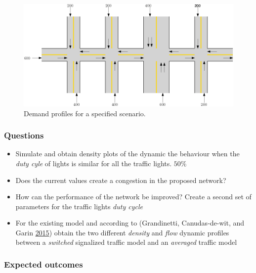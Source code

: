 \documentclass[]{book}
\theoremstyle{definition}
\theoremstyle{definition}
\theoremstyle{definition}
\theoremstyle{remark}
\begin{document}
\begin{figure}

{\centering \includegraphics{images/p1-02-flows} 

}

\caption{Demand profiles for a specified scenario.}\label{fig:flow}
\end{figure}

\hypertarget{questions-1}{%
\subsubsection*{Questions}\label{questions-1}}

\begin{itemize}
\item
  Simulate and obtain density plots of the dynamic the behaviour when
  the \emph{duty cyle} of lights is similar for all the traffic lights.
  \(50\%\)
\item
  Does the current values create a congestion in the proposed network?
\item
  How can the performance of the network be improved? Create a second
  set of parameters for the traffic lights \emph{duty cycle}
\item
  For the existing model and according to (Grandinetti, Canudas-de-wit,
  and Garin \protect\hyperlink{ref-Grandinetti2015}{2015}) obtain the
  two different \emph{density} and \emph{flow} dynamic profiles between
  a \emph{switched} signalized traffic model and an \emph{averaged}
  traffic model
\end{itemize}

\hypertarget{expected-outcomes-1}{%
\subsubsection*{Expected outcomes}\label{expected-outcomes-1}}
\end{document}

